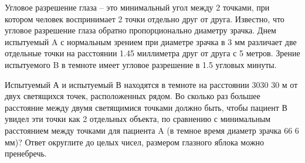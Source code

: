 
Угловое
разрешение глаза – это минимальный угол между 2 точками, при котором человек
воспринимает 2 точки отдельно друг от друга. Известно, что угловое разрешение
глаза обратно пропорционально диаметру зрачка. Днем испытуемый A с нормальным
зрением при диаметре зрачка в 3  мм различает две отдельные точки на расстоянии
1.45  миллиметра друг от друга с 5  метров. Зрение испытуемого B в темноте имеет
угловое разрешение в 1.5  угловых минуты. 

Испытуемый А и испытуемый В находятся в темноте на расстоянии
3030 30  м от двух светящихся точек, расположенных рядом.  Во сколько раз большее расстояние между двумя
светящимися точками должно быть, чтобы пациент В увидел эти точки как 2
отдельных объекта, по сравнению с минимальным расстоянием между точками для
пациента A (в темное время диаметр зрачка 66 6  мм)? Ответ округлите до целых
чисел, размером глазного яблока можно пренебречь.

\explanationSection

